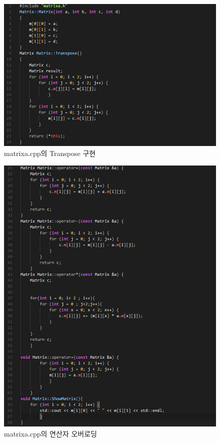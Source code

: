 \documentclass[a4paper,12pt]{article}
\begin{document}
\newpage
\begin{figure}[t]\vspace*{4pt} 
\centerline{\includegraphics[width=1.0\columnwidth]{atrans}} 
\caption{matrixa.cpp의 Transpose 구현}\vspace*{-6pt} 
\label{figure:matrixa} 
\end{figure} 

\begin{figure}[t]\vspace*{4pt} 
\centerline{\includegraphics[width=1.0\columnwidth]{aother}} 
\caption{matrixa.cpp의 연산자 오버로딩}\vspace*{-6pt} 
\label{figure:matrixa_overload} 
\end{figure} 
\end{document}

